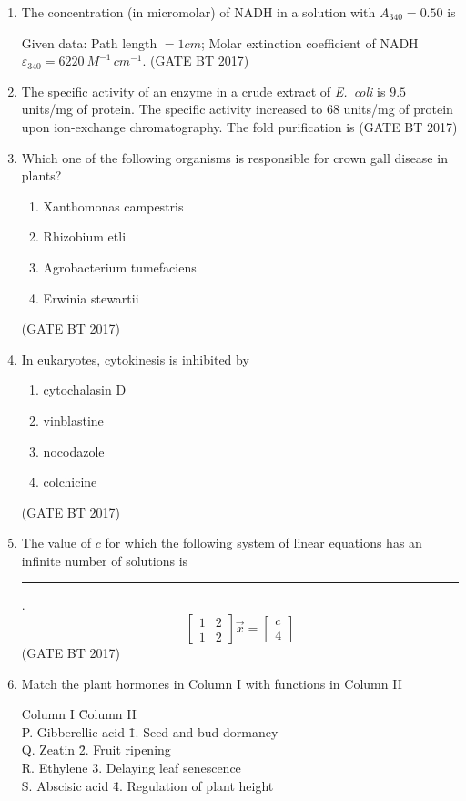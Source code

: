 \documentclass[journal,12pt,onecolumn]{IEEEtran}
\theoremstyle{remark}
\begin{document}
\begin{enumerate}
\item
The concentration (in micromolar) of NADH in a solution with $A_{340}=0.50$ is 

Given data: Path length $=1cm$; Molar extinction coefficient of NADH $\varepsilon_{340}=6220\ {M^{-1}\,cm^{-1}}$.
\hfill (GATE BT 2017)

\item
The specific activity of an enzyme in a crude extract of \textit{E.\ coli} is $9.5$ units/mg of protein. The specific activity increased to $68$ units/mg of protein upon ion-exchange chromatography. The fold purification is 
\hfill (GATE BT 2017)

\item Which one of the following organisms is responsible for crown gall disease in plants?  

\begin{enumerate}
    \item Xanthomonas campestris
    \item Rhizobium etli
    \item Agrobacterium tumefaciens
    \item Erwinia stewartii
\end{enumerate}
\hfill (GATE BT 2017)

\item In eukaryotes, cytokinesis is inhibited by  
\begin{enumerate}
    \item cytochalasin D
    \item vinblastine
    \item nocodazole
    \item colchicine
\end{enumerate}
\hfill (GATE BT 2017)

\item The value of $c$ for which the following system of linear equations has an infinite number of solutions is \rule{2cm}{0.4pt}.
\[
\begin{bmatrix}1 & 2\\ 1 & 2\end{bmatrix}
\vec{x} =
\begin{bmatrix}c\\ 4\end{bmatrix}
\]
\hfill (GATE BT 2017)

\item Match the plant hormones in Column I with functions in Column II

\begin{tabbing}
Column I \hspace{4cm} \= Column II \\ 
P. Gibberellic acid \= 1. Seed and bud dormancy \\ 
Q. Zeatin \= 2. Fruit ripening \\ 
R. Ethylene \= 3. Delaying leaf senescence \\ 
S. Abscisic acid \= 4. Regulation of plant height \\ 
\end{tabbing}


\end{enumerate}
\end{document}
